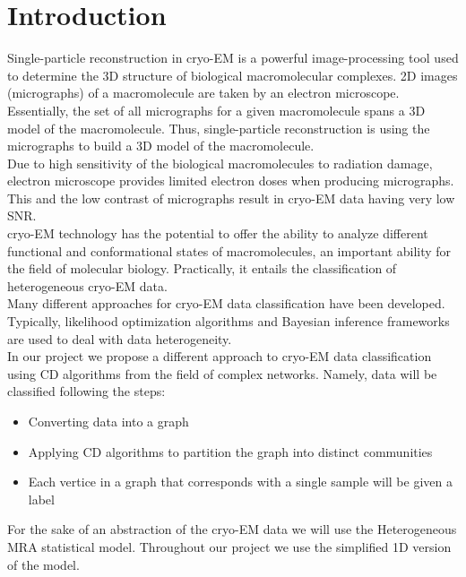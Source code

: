 \center

\section{Introduction}

\raggedright

Single-particle reconstruction in \acrshort{cryo-EM} is a powerful image-processing tool used to determine the 3D structure of biological macromolecular complexes.
2D images (micrographs) of a macromolecule are taken by an electron microscope. Essentially, the set of all micrographs for a given macromolecule spans a 3D model of the macromolecule. Thus, single-particle reconstruction is using the micrographs to build a 3D model of the macromolecule.\\

Due to high sensitivity of the biological macromolecules to radiation damage, electron microscope provides limited electron doses when producing micrographs. This and the low contrast of micrographs result in \acrshort{cryo-EM} data having very low \acrfull{SNR}\cite{9016106}.\\

\acrshort{cryo-EM} technology has the potential to offer the ability to analyze different functional and conformational states of macromolecules, an important ability for the field of molecular biology. Practically, it entails the classification of heterogeneous \acrshort{cryo-EM} data.\\

Many different approaches for \acrshort{cryo-EM} data classification have been developed. Typically, likelihood optimization algorithms and Bayesian inference frameworks are used to deal with data heterogeneity\cite{sigworth1998maximum,scheres2005fast,scheres2014beam,song2013flexibility,chowdhury2015structural}.\\ 

In our project we propose a different approach to \acrshort{cryo-EM} data classification using \acrfull{CD} algorithms from the field of complex networks. Namely, data will be classified following the steps:
\begin{itemize}
	\item Converting data into a graph
	\item Applying \acrlong{CD} algorithms to partition the graph into distinct communities
	\item Each vertice in a graph that corresponds with a single sample will be given a label
\end{itemize}

For the sake of an abstraction of the \acrshort{cryo-EM} data we will use the Heterogeneous \acrfull{MRA} statistical model. Throughout our project we use the simplified 1D version of the model.
